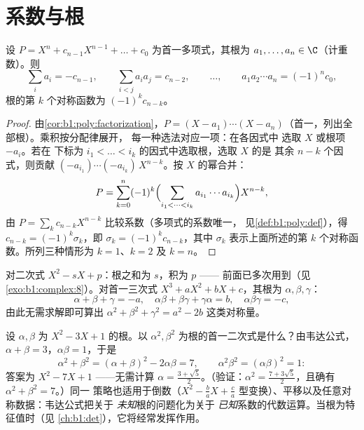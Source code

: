 \section{系数与根}

\begin{theorem}[韦达公式]\label{thm:b1:poly:vieta}
设 $P = X^n + c_{n-1} X^{n-1} + \dots + c_0$ 为首一多项式，其根为
$a_1, \dots, a_n \in \C$（计重数）。则
\[
\sum_i a_i = -c_{n-1},
\qquad
\sum_{i < j} a_i a_j = c_{n-2},
\qquad \dots, \qquad
a_1 a_2 \cdots a_n = (-1)^n c_0 ,
\]
根的第 $k$ 个对称函数为 $(-1)^k c_{n-k}$。
\end{theorem}

\begin{proof}
由\cref{cor:b1:poly:factorization}，$P = (X - a_1)\cdots(X -
a_n)$（首一，列出全部根）。乘积按分配律展开，
每一种选法对应一项：在各因式中
选取 $X$ 或根项 $-a_i$。若在
下标为 $i_1 < \dots < i_k$ 的因式中选取根，选取 $X$ 的是
其余 $n - k$ 个因式，则贡献 $(-a_{i_1})\cdots(-a_{i_k})\,X^{n-k}$。按
$X$ 的幂合并：
\[
P = \sum_{k=0}^{n} (-1)^k
\Bigl(\sum_{i_1 < \dots < i_k} a_{i_1}\cdots a_{i_k}\Bigr)
X^{n-k} ,
\]
由 $P = \sum_k c_{n-k}X^{n-k}$ 比较系数（多项式的系数唯一，
见\cref{def:b1:poly:def}），得 $c_{n-k} = (-1)^k
\sigma_k$，即 $\sigma_k = (-1)^kc_{n-k}$，其中 $\sigma_k$
表示上面所述的第 $k$ 个对称函数。所列三种情形为
$k = 1$、$k = 2$ 及 $k = n$。
\end{proof}

\begin{example}\label{ex:b1:poly:vieta}
对二次式 $X^2 - sX + p$：根之和为 $s$，积为 $p$ ——
前面已多次用到（见\cref{exo:b1:complex:8}）。对首一三次式
$X^3 + aX^2 + bX + c$，其根为 $\alpha, \beta, \gamma$：
\[
\alpha + \beta + \gamma = -a,
\quad
\alpha\beta + \beta\gamma + \gamma\alpha = b,
\quad
\alpha\beta\gamma = -c ,
\]
由此无需求解即可算出 $\alpha^2 + \beta^2
+ \gamma^2 = a^2 - 2b$ 这类对称量。
\end{example}

\begin{example}[不求根的根变换]\label{ex:b1:poly:transformroots}
设 $\alpha, \beta$ 为 $X^2 - 3X + 1$ 的根。以
$\alpha^2, \beta^2$ 为根的首一二次式是什么？由韦达公式，$\alpha +
\beta = 3$，$\alpha\beta = 1$，于是
\[
\alpha^2 + \beta^2 = (\alpha+\beta)^2 - 2\alpha\beta = 7,
\qquad
\alpha^2\beta^2 = (\alpha\beta)^2 = 1 :
\]
答案为 $X^2 - 7X + 1$ ——无需计算
$\alpha = \frac{3 + \sqrt5}2$。（验证：$\alpha^2 = \frac{7 +
3\sqrt5}2$，且确有 $\alpha^2 + \beta^2 = 7$。）同一
策略也适用于倒数（$X^2 - \frac ba X + \frac
ca$ 型变换）、平移以及任意对称数据：韦达公式把关于
\emph{未知}根的问题化为关于
\emph{已知}系数的代数运算。当根为特征值时（见
\cref{ch:b1:det}），它将经常发挥作用。
\end{example}

